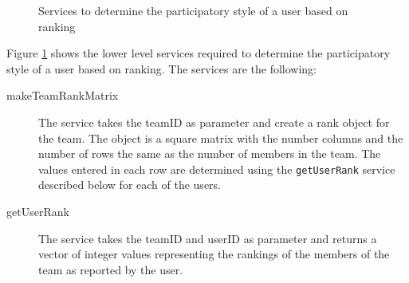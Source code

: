 \begin{figure}[htb]
\begin{center}
\end{center}
\caption{Services to determine the participatory style of a user based on ranking \label{fig:rank_functionalRequirements}}
\end{figure}

Figure \ref{fig:rank_functionalRequirements} shows the lower level services required to determine the participatory style of a user based on ranking. The services are the following:

\begin{description}

\item[makeTeamRankMatrix] The service takes the teamID as parameter and create a rank object for the team. The object is a square matrix with the number columns and the number of rows the same as the number of members in the team. The values entered in each row are determined using the \texttt{getUserRank} service described below for each of the users. 

\item[getUserRank] The service takes the teamID and userID as parameter and returns a vector of integer values representing the rankings of the members of the team as reported by the user. 

\end{description}  









